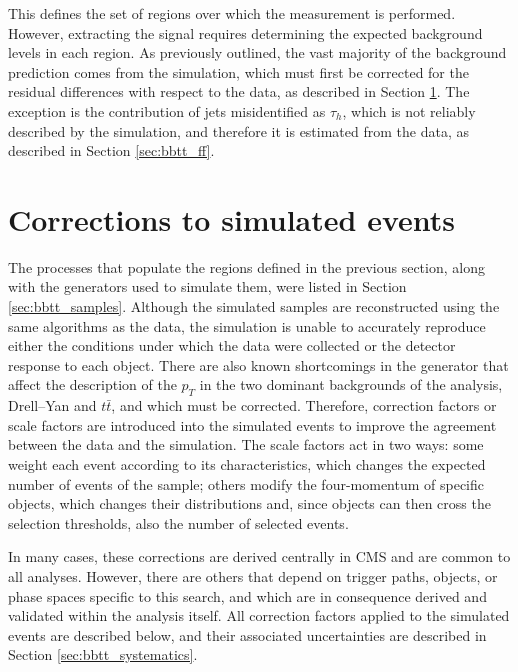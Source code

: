 This defines the set of regions over which the measurement is performed. However, extracting the signal requires determining the expected background levels in each region. As previously outlined, the vast majority of the background prediction comes from the simulation, which must first be corrected for the residual differences with respect to the data, as described in Section \ref{sec:bbtt_corrections}. The exception is the contribution of jets misidentified as $\tau_h$, which is not reliably described by the simulation, and therefore it is estimated from the data, as described in Section \ref{sec:bbtt_ff}.


\section{Corrections to simulated events}
\label{sec:bbtt_corrections}
%
The processes that populate the regions defined in the previous section, along with the generators used to simulate them, were listed in Section \ref{sec:bbtt_samples}. Although the simulated samples are reconstructed using the same algorithms as the data, the simulation is unable to accurately reproduce either the conditions under which the data were collected or the detector response to each object. There are also known shortcomings in the generator that affect the description of the $p_T$ in the two dominant backgrounds of the analysis, Drell--Yan and $t\bar{t}$, and which must be corrected. Therefore, correction factors or scale factors are introduced into the simulated events to improve the agreement between the data and the simulation. The scale factors act in two ways: some weight each event according to its characteristics, which changes the expected number of events of the sample; others modify the four-momentum of specific objects, which changes their distributions and, since objects can then cross the selection thresholds, also the number of selected events.

In many cases, these corrections are derived centrally in CMS and are common to all analyses. However, there are others that depend on trigger paths, objects, or phase spaces specific to this search, and which are in consequence derived and validated within the analysis itself. All correction factors applied to the simulated events are described below, and their associated uncertainties are described in Section \ref{sec:bbtt_systematics}.


